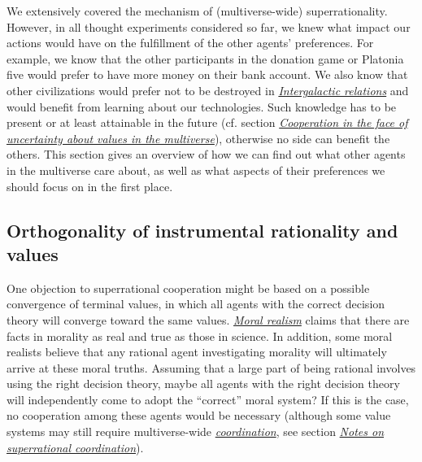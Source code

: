 We extensively covered the mechanism of (multiverse-wide)
superrationality. However, in all thought experiments considered so far,
we knew what impact our actions would have on the fulfillment of the
other agents' preferences. For example, we know that the other
participants in the donation game or Platonia five would prefer to have
more money on their bank account. We also know that other civilizations
would prefer not to be destroyed in
\protect\hyperlink{hierarchies-and-acyclic-graphs}{\emph{Intergalactic
relations}} and would benefit from learning about our technologies. Such
knowledge has to be present or at least attainable in the future (cf.
section
\protect\hyperlink{cooperation-in-the-face-of-uncertainty-about-values}{\emph{Cooperation
in the face of uncertainty about values in the multiverse}}),
otherwise no side can benefit the others. This section gives an overview
of how we can find out what other agents in the multiverse care about,
as well as what aspects of their preferences we should focus on in the
first place.

\hypertarget{orthogonality-of-instrumental-rationality-and-values}{\subsection{Orthogonality
of instrumental rationality and
values}\label{orthogonality-of-instrumental-rationality-and-values}}

One objection to superrational cooperation might be based on a possible
convergence of terminal values, in which all agents with the correct
decision theory will converge toward the same values.
\href{https://en.wikipedia.org/wiki/Moral_realism}{\emph{Moral realism}}
claims that there are facts in morality as real and true as those in
science. In addition, some moral realists believe that any rational
agent investigating morality will ultimately arrive at these moral
truths. Assuming that a large part of being rational involves using the
right decision theory, maybe all agents with the right decision theory
will independently come to adopt the ``correct'' moral system? If this
is the case, no cooperation among these agents would be necessary
(although some value systems may still require multiverse-wide
\protect\hyperlink{notes-on-superrational-coordination}{\emph{coordination}},
see section
\protect\hyperlink{notes-on-superrational-coordination}{\emph{Notes on
superrational coordination}}).

